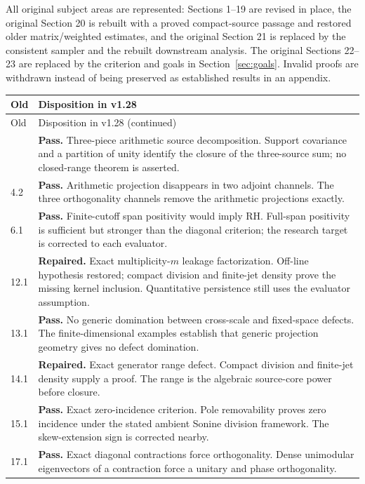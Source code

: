 \documentclass[11pt]{article}
\theoremstyle{remark}
\begin{document}
All original subject areas are represented: Sections 1--19 are revised in
place, the original Section 20 is rebuilt with a proved compact-source passage
and restored older matrix/weighted estimates, and the original Section 21
is replaced by the consistent sampler and the rebuilt downstream analysis.
The original Sections 22--23 are replaced by the criterion and goals in
Section~\ref{sec:goals}. Invalid proofs are withdrawn instead of being
preserved as established results in an appendix.

\small
\begin{longtable}{@{}p{}p{}@{}}
\toprule Old & Disposition in v1.28 \\
\midrule\endfirsthead
\toprule Old & Disposition in v1.28 (continued) \\
\midrule\endhead
\bottomrule\endfoot
4.1 & \textbf{Pass.} Three-piece arithmetic source decomposition. Support covariance and a partition of unity identify the closure of the three-source sum; no closed-range theorem is asserted. \\[4pt]
4.2 & \textbf{Pass.} Arithmetic projection disappears in two adjoint channels. The three orthogonality channels remove the arithmetic projections exactly. \\[4pt]
6.1 & \textbf{Pass.} Finite-cutoff span positivity would imply RH. Full-span positivity is sufficient but stronger than the diagonal criterion; the research target is corrected to each evaluator. \\[4pt]
12.1 & \textbf{Repaired.} Exact multiplicity-$m$ leakage factorization. Off-line hypothesis restored; compact division and finite-jet density prove the missing kernel inclusion. Quantitative persistence still uses the evaluator assumption. \\[4pt]
13.1 & \textbf{Pass.} No generic domination between cross-scale and fixed-space defects. The finite-dimensional examples establish that generic projection geometry gives no defect domination. \\[4pt]
14.1 & \textbf{Repaired.} Exact generator range defect. Compact division and finite-jet density supply a proof. The range is the algebraic source-core power before closure. \\[4pt]
15.1 & \textbf{Pass.} Exact zero-incidence criterion. Pole removability proves zero incidence under the stated ambient Sonine division framework. The skew-extension sign is corrected nearby. \\[4pt]
17.1 & \textbf{Pass.} Exact diagonal contractions force orthogonality. Dense unimodular eigenvectors of a contraction force a unitary and phase orthogonality. \\[4pt]

\end{longtable}
\end{document}
